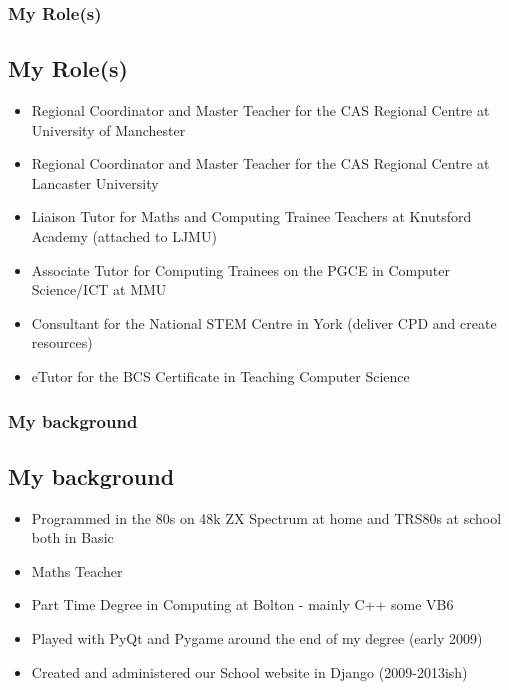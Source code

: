 \documentclass{beamer}
\begin{document}
\begin{frame}
\frametitle{My Role(s)}
\subsection{My Role(s)}
\begin{itemize}
\item Regional Coordinator and Master Teacher for the CAS Regional Centre at University of Manchester
  
\item Regional Coordinator and Master Teacher for the CAS Regional Centre at Lancaster University
  
\item Liaison Tutor for Maths and Computing Trainee Teachers at Knutsford Academy (attached to LJMU)
  
\item Associate Tutor for Computing Trainees on the PGCE in Computer Science/ICT at MMU
  
\item Consultant for the National STEM Centre in York (deliver CPD and create resources)
  
\item eTutor for the BCS Certificate in Teaching Computer Science
   
\end{itemize}
\end{frame}


\begin{frame}
\frametitle{My background}
\subsection{My background}

\begin{itemize}
  
\item Programmed in the 80s on 48k ZX Spectrum at home and TRS80s at school both in Basic
  
\item Maths Teacher
  
\item Part Time Degree in Computing at Bolton - mainly C++ some VB6
  
\item Played with PyQt and Pygame around the end of my degree (early 2009)
  
\item Created and administered our School website in Django (2009-2013ish)
\end{itemize}

\end{frame}
\end{document}
